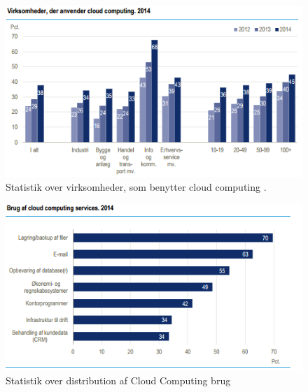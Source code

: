 \begin{figure}
    \centering
    \includegraphics[width=1\textwidth]{figures/virksomhederderanvendercc.png}
    \caption{Statistik over virksomheder, som benytter cloud computing \citep{itvirk}.} 
    \label{fig:virksomcc}
\end{figure}

\begin{figure}
    \centering
    \includegraphics[width=1\textwidth]{figures/brugafccservices.png}
    \caption{Statistik over distribution af Cloud Computing brug \citep{itvirk}}
    \label{fig:distcc}
\end{figure}

